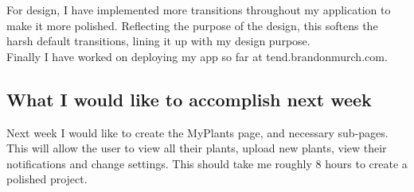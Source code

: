 \documentclass[portfolio.tex]{subfiles}
\begin{document}
	 	For design, I have implemented more transitions throughout my application to make it more polished. Reflecting the purpose of the design, this softens the harsh default transitions, lining it up with my design purpose.\\

	 	Finally I have worked on deploying my app so far at tend.brandonmurch.com.\\

	\subsection{What I would like to accomplish next week}
		Next week I would like to create the MyPlants page, and necessary sub-pages. This will allow the user to view all their plants, upload new plants, view their notifications and change settings. This should take me roughly 8 hours to create a polished project.

\pagebreak
\end{document}
